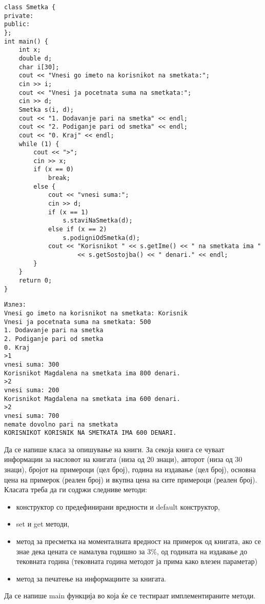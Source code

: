 \documentclass[12pt,a4paper]{exam}
\begin{document}
\begin{questions}
\begin{lstlisting}
class Smetka {
private:
public:
};
int main() {
    int x;
    double d;
    char i[30];
    cout << "Vnesi go imeto na korisnikot na smetkata:";
    cin >> i;
    cout << "Vnesi ja pocetnata suma na smetkata:";
    cin >> d;
    Smetka s(i, d);
    cout << "1. Dodavanje pari na smetka" << endl;
    cout << "2. Podiganje pari od smetka" << endl;
    cout << "0. Kraj" << endl;
    while (1) {
        cout << ">";
        cin >> x;
        if (x == 0)
            break;
        else {
            cout << "vnesi suma:";
            cin >> d;
            if (x == 1)
                s.staviNaSmetka(d);
            else if (x == 2)
                s.podigniOdSmetka(d);
            cout << "Korisnikot " << s.getIme() << " na smetkata ima "
                    << s.getSostojba() << " denari." << endl;
        }
    }
    return 0;
}
\end{lstlisting}
\begin{verbatim}
Излез:
Vnesi go imeto na korisnikot na smetkata: Korisnik
Vnesi ja pocetnata suma na smetkata: 500
1. Dodavanje pari na smetka
2. Podiganje pari od smetka
0. Kraj
>1
vnesi suma: 300
Korisnikot Magdalena na smetkata ima 800 denari.
>2
vnesi suma: 200
Korisnikot Magdalena na smetkata ima 600 denari.
>2
vnesi suma: 700
nemate dovolno pari na smetkata
KORISNIKOT KORISNIK NA SMETKATA IMA 600 DENARI.
\end{verbatim}

\question
Да се напише класа за опишување на книги. За секоја книга се чуваат информации
за насловот на книгата (низа од 20 знаци), авторот (низа од 30 знаци), бројот на
примероци (цел број), година на издавање (цел број), основна цена на примерок
(реален број) и вкупна цена на сите примероци (реален број). Класата треба да ги
содржи следниве методи: 
\begin{itemize}
  \item конструктор со предефинирани вредности и default конструктор,
  \item set и get методи,
  \item метод за пресметка на моменталната вредност на примерок од
книгата, ако се знае дека цената се намалува годишно за 3\%, од годината на
издавање до тековната година (тековната година методот ја прима како влезен параметар)
\item метод за печатење на информациите за книгата.
\end{itemize}
Да се напише main функција во која ќе се тестираат имплементираните методи.


\end{questions}
\end{document}
